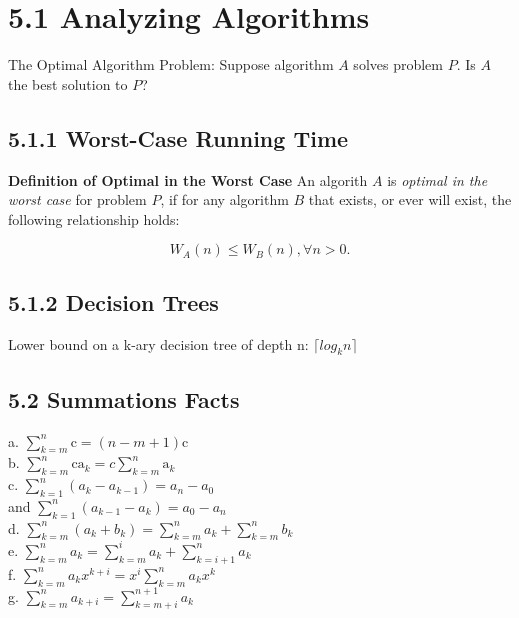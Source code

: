 \documentclass[10pt,twocolumn]{article}
\begin{document}
	\section*{5.1 Analyzing Algorithms}
	
	The Optimal Algorithm Problem: Suppose algorithm $A$ solves problem $P$. Is $A$ the best solution to $P$?
	
	\subsection*{5.1.1 Worst-Case Running Time}
	
	\textbf{Definition of Optimal in the Worst Case} An algorith $A$ is \emph{optimal in the worst case} for problem $P$, if for any algorithm $B$ that exists, or ever will exist, the following relationship holds:
	
	\[W_A(n)\leq W_B(n),\forall n>0.\]
	
	\subsection*{5.1.2 Decision Trees}
	
	Lower bound on a k-ary decision tree of depth n: $\lceil log_k n\rceil$
	
	\subsection*{5.2 Summations Facts}
	a. $\displaystyle \sum_{k=m}^n \mathrm{c} = (n - m + 1)\mathrm{c}$ \\
	b. $\displaystyle \sum_{k=m}^n \mathrm{c a_\mathit{k}} = c
	\displaystyle\sum_{k=m}^n \mathrm{a_\mathit{k}}$\\
	c. $\displaystyle\sum_{k=1}^n (a_\mathit{k} - a_\mathit{k - 1}) =
	a_\mathit{n} - a_\mathit{0}$ \\
		and $ \displaystyle\sum_{k=1}^n
	(a_\mathit{k - 1} - a_\mathit{k}) = a_\mathit{0} - a_\mathit{n}$\\
	d. $\displaystyle\sum_{k=m}^n (a_\mathit{k} + b_\mathit{k}) =
	\displaystyle\sum_{k=m}^n a_\mathit{k} + \displaystyle\sum_{k=m}^n
	b_\mathit{k}$\\
	e. $\displaystyle\sum_{k=m}^n a_\mathit{k} = \displaystyle\sum_{k=m}^i
	a_\mathit{k} +  \displaystyle\sum_{k=i+1}^n a_\mathit{k}$\\
	f. $\displaystyle\sum_{k=m}^n a_\mathit{k}x^\mathit{k+i} = 
	x^\mathit{i} \sum_{k=m}^n a_\mathit{k}x^\mathit{k}$\\
	g. $\displaystyle\sum_{k=m}^n a_\mathit{k+i} = \displaystyle\sum_{k=m+i}^{n+1}
	a_\mathit{k}$\\
\end{document}
